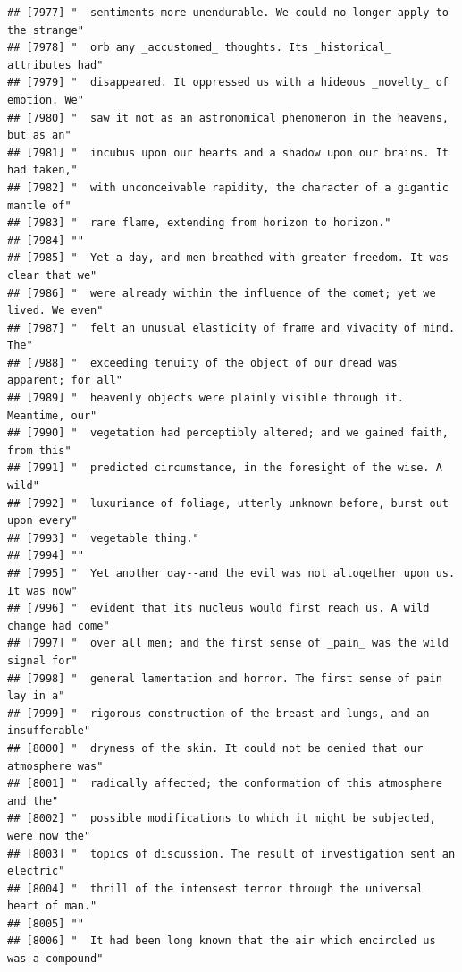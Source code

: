 \documentclass{article}\usepackage[]{graphicx}\usepackage[]{color}
\makeatletter
\newenvironment{kframe}{%
 \def\at@end@of@kframe{}%
 \ifinner\ifhmode%
  \def\at@end@of@kframe{\end{minipage}}%
  \begin{minipage}{\columnwidth}%
 \fi\fi%
 \def\FrameCommand##1{\hskip\@totalleftmargin \hskip-\fboxsep
 \colorbox{shadecolor}{##1}\hskip-\fboxsep
     \hskip-\linewidth \hskip-\@totalleftmargin \hskip\columnwidth}%
 \MakeFramed {\advance\hsize-\width
   \@totalleftmargin\z@ \linewidth\hsize
   \@setminipage}}%
 {\par\unskip\endMakeFramed%
 \at@end@of@kframe}
\newenvironment{knitrout}{}{} %
\makeatother
\begin{document}
\begin{knitrout}
\begin{kframe}
\begin{verbatim}
## [7977] "  sentiments more unendurable. We could no longer apply to the strange"      
## [7978] "  orb any _accustomed_ thoughts. Its _historical_ attributes had"            
## [7979] "  disappeared. It oppressed us with a hideous _novelty_ of emotion. We"      
## [7980] "  saw it not as an astronomical phenomenon in the heavens, but as an"        
## [7981] "  incubus upon our hearts and a shadow upon our brains. It had taken,"       
## [7982] "  with unconceivable rapidity, the character of a gigantic mantle of"        
## [7983] "  rare flame, extending from horizon to horizon."                            
## [7984] ""                                                                            
## [7985] "  Yet a day, and men breathed with greater freedom. It was clear that we"    
## [7986] "  were already within the influence of the comet; yet we lived. We even"     
## [7987] "  felt an unusual elasticity of frame and vivacity of mind. The"             
## [7988] "  exceeding tenuity of the object of our dread was apparent; for all"        
## [7989] "  heavenly objects were plainly visible through it. Meantime, our"           
## [7990] "  vegetation had perceptibly altered; and we gained faith, from this"        
## [7991] "  predicted circumstance, in the foresight of the wise. A wild"              
## [7992] "  luxuriance of foliage, utterly unknown before, burst out upon every"       
## [7993] "  vegetable thing."                                                          
## [7994] ""                                                                            
## [7995] "  Yet another day--and the evil was not altogether upon us. It was now"      
## [7996] "  evident that its nucleus would first reach us. A wild change had come"     
## [7997] "  over all men; and the first sense of _pain_ was the wild signal for"       
## [7998] "  general lamentation and horror. The first sense of pain lay in a"          
## [7999] "  rigorous construction of the breast and lungs, and an insufferable"        
## [8000] "  dryness of the skin. It could not be denied that our atmosphere was"       
## [8001] "  radically affected; the conformation of this atmosphere and the"           
## [8002] "  possible modifications to which it might be subjected, were now the"       
## [8003] "  topics of discussion. The result of investigation sent an electric"        
## [8004] "  thrill of the intensest terror through the universal heart of man."        
## [8005] ""                                                                            
## [8006] "  It had been long known that the air which encircled us was a compound"     

\end{verbatim}
\end{kframe}
\end{knitrout}
\end{document}

